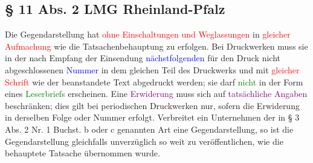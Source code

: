 \subsection{§ 11 Abs. 2 LMG Rheinland-Pfalz}
Die Gegendarstellung hat \textcolor{red}{ohne Einschaltungen und Weglassungen} in \textcolor{red}{gleicher Aufmachung} wie die Tatsachenbehauptung zu erfolgen. Bei Druckwerken muss sie in der nach Empfang der Einsendung \textcolor{blue}{nächstfolgenden} für den Druck nicht abgeschlossenen \textcolor{blue}{Nummer} in dem gleichen Teil des Druckwerks und mit \textcolor{red}{gleicher Schrift} wie der beanstandete Text abgedruckt werden; sie darf \textcolor{green}{nicht} in der Form eines \textcolor{green}{Leserbriefs} erscheinen. Eine \textcolor{purple}{Erwiderung} muss sich auf \textcolor{purple}{tatsächliche Angaben} beschränken; dies gilt bei periodischen Druckwerken nur, sofern die Erwiderung in derselben Folge oder Nummer erfolgt. Verbreitet ein Unternehmen der in § 3 Abs. 2 Nr. 1 Buchst. b oder c genannten Art eine Gegendarstellung, so ist die Gegendarstellung gleichfalls unverzüglich so weit zu veröffentlichen, wie die behauptete Tatsache übernommen wurde.
